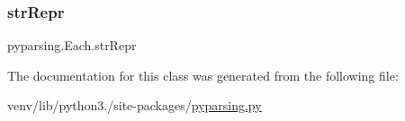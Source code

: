 \subsubsection{\texorpdfstring{str\+Repr}{strRepr}}
{\footnotesize\ttfamily pyparsing.\+Each.\+str\+Repr}



The documentation for this class was generated from the following file\+:\begin{DoxyCompactItemize}
\item 
venv/lib/python3./site-\/packages/\hyperlink{pyparsing_8py}{pyparsing.\+py}\end{DoxyCompactItemize}
